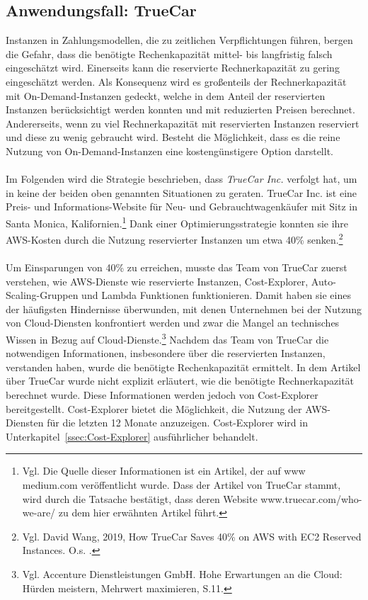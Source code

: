 \subsection{Anwendungsfall: TrueCar}\label{ssec:UseCaseTrueCar}
Instanzen in Zahlungsmodellen, die zu zeitlichen Verpflichtungen führen, bergen die Gefahr, dass die benötigte Rechenkapazität mittel- bis langfristig falsch eingeschätzt wird. Einerseits kann die reservierte Rechnerkapazität zu gering eingeschätzt werden. Als Konsequenz wird es großenteils der Rechnerkapazität mit On-Demand-Instanzen gedeckt, welche in dem Anteil der reservierten Instanzen berücksichtigt werden konnten und mit reduzierten Preisen berechnet. Andererseits, wenn zu viel Rechnerkapazität mit reservierten Instanzen reserviert und diese zu wenig gebraucht wird. Besteht die Möglichkeit, dass es die reine Nutzung von On-Demand-Instanzen eine kostengünstigere Option darstellt.
\\\\
Im Folgenden wird die Strategie beschrieben, dass \textit{TrueCar Inc.} verfolgt hat, um in keine der beiden oben genannten Situationen zu geraten. TrueCar Inc. ist eine Preis- und Informations-Website für Neu- und Gebrauchtwagenkäufer mit Sitz in Santa Monica, Kalifornien.\footnote{Vgl. Die Quelle dieser Informationen ist ein Artikel\cite{MED1}, der auf www medium.com veröffentlicht wurde. Dass der Artikel von TrueCar stammt, wird durch die Tatsache bestätigt, dass deren Website www.truecar.com/who-we-are/ zu dem hier erwähnten Artikel führt.}
Dank einer Optimierungsstrategie konnten sie ihre AWS-Kosten durch die Nutzung reservierter Instanzen um etwa 40\% senken.\footnote{Vgl. David Wang, 2019, How TrueCar Saves 40\% on AWS with EC2 Reserved Instances. O.s. \cite{MED1}.}
\\\\
Um Einsparungen von 40\% zu erreichen, musste das Team von TrueCar zuerst verstehen, wie AWS-Dienste wie reservierte Instanzen, Cost-Explorer, Auto-Scaling-Gruppen und Lambda Funktionen funktionieren. Damit haben sie eines der häufigsten Hindernisse überwunden, mit denen Unternehmen bei der Nutzung von Cloud-Diensten konfrontiert werden und zwar die Mangel an technisches Wissen in Bezug auf Cloud-Dienste.\footnote{Vgl. Accenture Dienstleistungen GmbH. Hohe Erwartungen an die Cloud: Hürden meistern, Mehrwert maximieren, S.11\cite{ACC1}.} Nachdem das Team von TrueCar die notwendigen Informationen, insbesondere über die reservierten Instanzen, verstanden haben, wurde die benötigte Rechenkapazität ermittelt. In dem Artikel über TrueCar wurde nicht explizit erläutert, wie die benötigte Rechnerkapazität berechnet wurde. Diese Informationen werden jedoch von Cost-Explorer bereitgestellt. Cost-Explorer bietet die Möglichkeit, die Nutzung der AWS-Diensten für die letzten 12 Monate anzuzeigen. Cost-Explorer wird in Unterkapitel~\ref{ssec:Cost-Explorer} ausführlicher behandelt.
